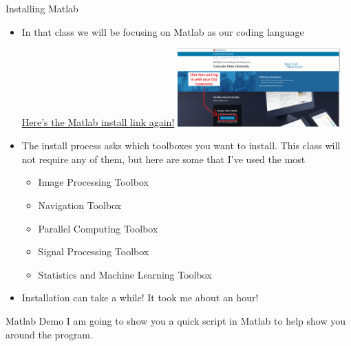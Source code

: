 {}\documentclass[letterpaper,
compress,
xcolor=x11names,
]{beamer}
\begin{document}
\begin{frame}{Installing Matlab}
	\footnotesize
	\begin{itemize}
		\item In that class we will be focusing on Matlab as our coding language \\
		\begin{center}		
			\textcolor{blue}{\href{https://www.mathworks.com/academia/tah-portal/colorado-state-university-40638290.html}{Here's the Matlab install link again!}}
			\includegraphics[height = 3cm]{MatlabInstallSite.png}
		\end{center}
		\item The install process asks which toolboxes you want to install. This class will not require any of them, but here are some that I've used the most
		\begin{itemize}
			\item Image Processing Toolbox
			\item Navigation Toolbox
			\item Parallel Computing Toolbox
			\item Signal Processing Toolbox
			\item Statistics and Machine Learning Toolbox
		\end{itemize}
		\item Installation can take a while! It took me about an hour!
	\end{itemize}
\end{frame}
\begin{frame}{Matlab Demo}
	I am going to show you a quick script in Matlab to help show you around the program.
\end{frame}
\end{document}
